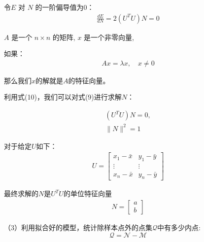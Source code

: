 \documentclass{seuer}
\begin{document}
令$E$ 对 $N$ 的一阶偏导值为0：
\begin{equation}\label{EQ1}
  \begin{array}{ll}
    \frac{d E}{d N}=2\left(U^{T} U\right) N=0
  \end{array}
\end{equation}

$A$ 是一个 $n \times n$ 的矩阵, $x$ 是一个非零向量, 

如果：
\begin{equation}\label{EQ1}
  \begin{array}{ll}
    A x=\lambda x, \quad x \neq 0
  \end{array}
\end{equation}

那么我们$x$的解就是$A$的特征向量。

利用式(10)，我们可以对式(9)进行求解$N$：

\begin{equation}\label{EQ1}
  \begin{array}{ll}
    (U^TU)N=0,\\
    \|N\|^2=1
  \end{array}
\end{equation}

对于给定$U$如下：
\begin{equation}\label{EQ1}
  \begin{array}{ll}
    U=\left[\begin{array}{cc}
      x_{1}-\bar{x} & y_{1}-\bar{y} \\
      \vdots & \vdots \\
      x_{n}-\bar{x} & y_{n}-\bar{y}
      \end{array}\right]
  \end{array}
\end{equation}

最终求解的$N$是$U^TU$的单位特征向量
\begin{equation}\label{EQ1}
  \begin{array}{ll}
    N=\left[\begin{array}{cc}
      a\\
      b
      \end{array}\right]
  \end{array}
\end{equation}

（3）利用拟合好的模型，统计除样本点外的点集$\mathcal{Q}$中有多少内点:
\begin{equation}\label{EQ1}
  \mathcal{Q}=\mathcal{N}-\mathcal{M}
\end{equation}
\end{document}
